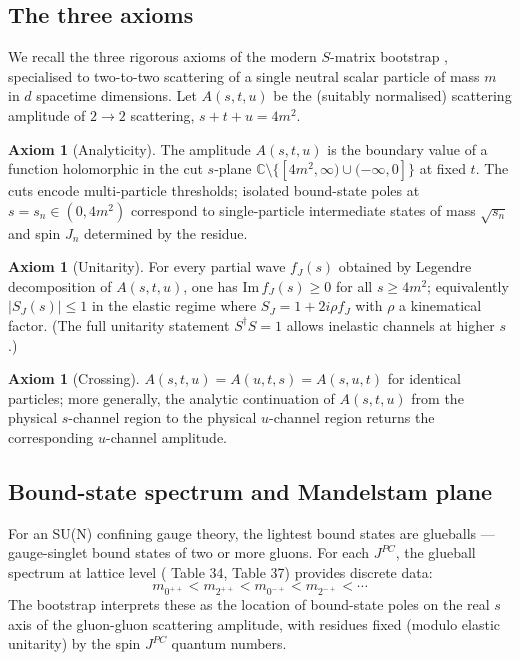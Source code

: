 \documentclass[11pt]{amsart}
\theoremstyle{definition}
\newtheorem{axiom}[theorem]{Axiom}
\theoremstyle{remark}
\newcommand{\C}{\mathbb{C}}
\begin{document}
\subsection{The three axioms}\label{ss:axioms}

We recall the three rigorous axioms of the modern $S$-matrix bootstrap
\cite{PaulosI,PaulosII,PaulosIII}, specialised to two-to-two scattering
of a single neutral scalar particle of mass $m$ in $d$ spacetime dimensions.
Let $A(s, t, u)$ be the (suitably normalised) scattering amplitude
of $2 \to 2$ scattering, $s + t + u = 4m^2$.

\begin{axiom}[Analyticity]\label{ax:analyticity}
The amplitude $A(s, t, u)$ is the boundary value of a function holomorphic
in the cut $s$-plane $\C \setminus \{[4m^2, \infty) \cup (-\infty, 0]\}$ at
fixed $t$. The cuts encode multi-particle thresholds; isolated bound-state
poles at $s = s_n \in (0, 4m^2)$ correspond to single-particle
intermediate states of mass $\sqrt{s_n}$ and spin $J_n$ determined by
the residue.
\end{axiom}

\begin{axiom}[Unitarity]\label{ax:unitarity}
For every partial wave $f_J(s)$ obtained by Legendre decomposition of
$A(s, t, u)$, one has $\mathrm{Im}\, f_J(s) \ge 0$ for all $s \ge 4m^2$;
equivalently $|S_J(s)| \le 1$ in the elastic regime where $S_J = 1 + 2i
\rho f_J$ with $\rho$ a kinematical factor. (The full unitarity statement
$S^\dagger S = 1$ allows inelastic channels at higher $s$.)
\end{axiom}

\begin{axiom}[Crossing]\label{ax:crossing}
$A(s, t, u) = A(u, t, s) = A(s, u, t)$ for identical particles; more
generally, the analytic continuation of $A(s, t, u)$ from the physical
$s$-channel region to the physical $u$-channel region returns the
corresponding $u$-channel amplitude.
\end{axiom}

\subsection{Bound-state spectrum and Mandelstam plane}\label{ss:bound-states}

For an SU(N) confining gauge theory, the lightest bound states are
glueballs --- gauge-singlet bound states of two or more gluons. For
each $J^{PC}$, the glueball spectrum at lattice level (\cite{Athenodorou2021}
Table 34, Table 37) provides discrete data:
\[
m_{0^{++}} < m_{2^{++}} < m_{0^{-+}} < m_{2^{-+}} < \cdots
\]
The bootstrap interprets these as the location of bound-state poles on
the real $s$ axis of the gluon-gluon scattering amplitude, with residues
fixed (modulo elastic unitarity) by the spin $J^{PC}$ quantum numbers.
\end{document}

